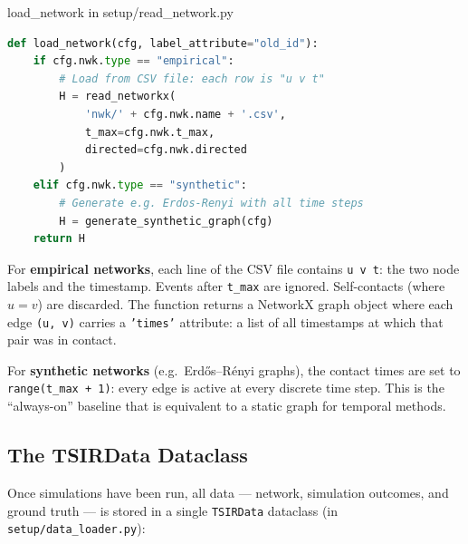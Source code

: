 \begin{codewalk}{load\_network in setup/read\_network.py}
\begin{lstlisting}[language=Python]
def load_network(cfg, label_attribute="old_id"):
    if cfg.nwk.type == "empirical":
        # Load from CSV file: each row is "u v t"
        H = read_networkx(
            'nwk/' + cfg.nwk.name + '.csv',
            t_max=cfg.nwk.t_max,
            directed=cfg.nwk.directed
        )
    elif cfg.nwk.type == "synthetic":
        # Generate e.g. Erdos-Renyi with all time steps
        H = generate_synthetic_graph(cfg)
    return H
\end{lstlisting}

For \textbf{empirical networks}, each line of the CSV file contains \texttt{u v t}: the two
node labels and the timestamp. Events after \texttt{t\_max} are ignored. Self-contacts
(where $u = v$) are discarded. The function returns a NetworkX graph object where each edge
\texttt{(u, v)} carries a \texttt{'times'} attribute: a list of all timestamps at which that
pair was in contact.

For \textbf{synthetic networks} (e.g.\ Erd\H{o}s--R\'enyi graphs), the contact times are set
to \texttt{range(t\_max + 1)}: every edge is active at every discrete time step. This is the
``always-on'' baseline that is equivalent to a static graph for temporal methods.
\end{codewalk}

\subsection{The TSIRData Dataclass}

Once simulations have been run, all data --- network, simulation outcomes, and ground truth ---
is stored in a single \texttt{TSIRData} dataclass (in \texttt{setup/data\_loader.py}):

